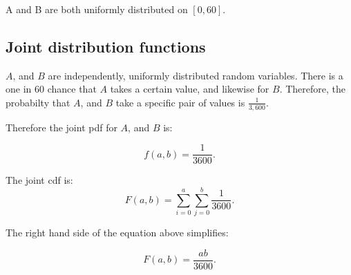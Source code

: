 \documentclass[a5paper,11pt]{article}
\begin{document}
A and B are both uniformly distributed on
$\left[0,60\right]$.

\subsection{Joint distribution functions}
$A$, and $B$ are independently, uniformly
distributed random variables. There is a 
one in 60 chance that $A$ takes a 
certain value, and likewise for $B$.
Therefore, the probabilty that $A$, and
$B$ take a specific pair of values is
$\frac{1}{3,600}$.

Therefore the joint pdf for $A$, and $B$
is:

\begin{equation}
f\left(a, b \right) = \frac{1}{3600}.
\end{equation}

The joint cdf is:
\begin{equation}
F\left(a,b\right)=
\sum_{i=0}^{a} \sum_{j=0}^{b}
\frac{1}{3600}.
\end{equation}

The right hand side of the equation above
simplifies:

\begin{equation}
F\left(a,b\right)=
\frac{ab}{3600}.
\end{equation}


\printbibliography{}
\end{document}
